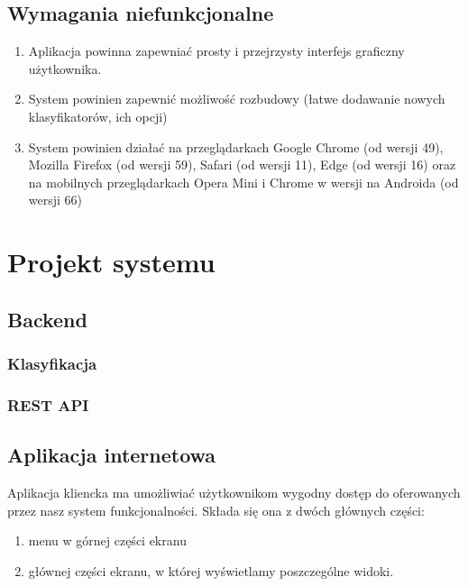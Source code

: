 \documentclass[a4paper, 11pt]{report}
\begin{document}
	\section{Wymagania niefunkcjonalne}
	
	\begin{enumerate}
	\item Aplikacja powinna zapewniać prosty i przejrzysty interfejs graficzny użytkownika.
	\item System powinien zapewnić możliwość rozbudowy (łatwe dodawanie nowych klasyfikatorów, ich opcji)
	\item System powinien działać na przeglądarkach Google Chrome (od wersji 49), Mozilla Firefox (od wersji 59), Safari (od wersji 11), Edge (od wersji 16) oraz na mobilnych przeglądarkach Opera Mini i Chrome w wersji na Androida (od wersji 66)
	\end{enumerate}
	
	
\chapter{Projekt systemu}

	\section{Backend}
	
		\subsection{Klasyfikacja}	
	
		\subsection{REST API}
	
	
	\section{Aplikacja internetowa}
	
Aplikacja kliencka ma umożliwiać użytkownikom wygodny dostęp do oferowanych przez nasz system funkcjonalności. 	Składa się ona z dwóch głównych części:
	
	\begin{enumerate}
	\item menu w górnej części ekranu
	\item głównej części ekranu, w której wyświetlamy poszczególne widoki.
	\end{enumerate}
	
\end{document}
